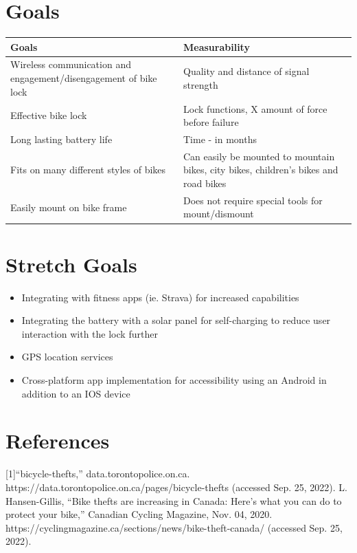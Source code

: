 \documentclass{article}
\begin{document}
\section{Goals}
\begin{table}[hp]
  \begin{center}
    \begin{tabular}{| p{0.5\linewidth} | p{0.5\linewidth} |}
    \hline
      \textbf{Goals} & \textbf{Measurability}\\
      \hline
      Wireless communication and engagement/disengagement of bike lock  & Quality and distance of signal strength\\
      \hline
      Effective bike lock  & Lock functions, X amount of force before failure\\
      \hline
      Long lasting battery life  & Time - in months \\
      \hline
      Fits on many different styles of bikes & Can easily be mounted to mountain bikes, city bikes, children's bikes and road bikes \\
      \hline
      Easily mount on bike frame & Does not require special tools for mount/dismount\\
      \hline
    \end{tabular}
  \end{center}
\end{table}

\section{Stretch Goals}
\begin{itemize}
\item Integrating with fitness apps (ie. Strava) for increased capabilities
\item Integrating the battery with a solar panel for self-charging to reduce user interaction with the lock further
\item GPS location services
\item Cross-platform app implementation for accessibility using an Android in addition to an IOS device
\end{itemize}

\section{References}

[1]“bicycle-thefts,” data.torontopolice.on.ca. https://data.torontopolice.on.ca/pages/bicycle-thefts (accessed Sep. 25, 2022).
\newline
[2]L. Hansen-Gillis, “Bike thefts are increasing in Canada: Here’s what you can do to protect your bike,” Canadian Cycling Magazine, Nov. 04, 2020. https://cyclingmagazine.ca/sections/news/bike-theft-canada/ (accessed Sep. 25, 2022).
‌
‌
\end{document}
